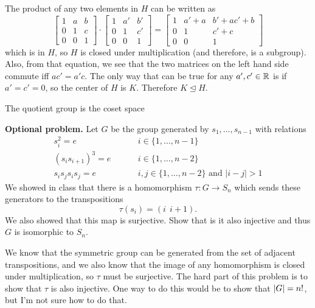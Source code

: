\documentclass{article}
\begin{document}
The product of any two elements in $H$ can be written as
\[ \begin{bmatrix}
    1 & a & b \\
    0 & 1 & c \\
    0 & 0 & 1
\end{bmatrix} \cdot \begin{bmatrix}
    1 & a' & b' \\
    0 & 1 & c' \\
    0 & 0 & 1
\end{bmatrix} = \begin{bmatrix}
    1 & a'+a & b'+ac'+b \\
    0 & 1 & c'+c \\
    0 & 0 & 1
\end{bmatrix} \]
which is in $H$, so $H$ is closed under multiplication (and therefore, is a subgroup). Also, from that equation, we see that the two matrices on the left hand side commute iff $ac'=a'c$. The only way that can be true for any $a',c' \in \mathbb{R}$ is if $a'=c'=0$, so the center of $H$ is $K$. Therefore $K \trianglelefteq H$.
\par
The quotient group is the coset space

\bigskip
\begin{prob}
    \textbf{Optional problem.} Let $G$ be the group generated by $s_1, \dots, s_{n-1}$ with relations
    \begin{align*}
        s_i^2=e &\hspace{1cm} i\in\{1, \dots, n-1\} \\
        (s_is_{i+1})^3=e &\hspace{1cm} i\in\{1, \dots, n-2\} \\
        s_i s_j s_i s_j=e &\hspace{1cm} i,j\in\{1, \dots, n-2\} \text{ and } |i-j|>1
    \end{align*}
    We showed in class that there is a homomorphism $\tau: G \rightarrow S_n$ which sends these generators to the transpositions
    \[ \tau(s_i) = (i\ \ i+1) .\]
    We also showed that this map is surjective. Show that is it also injective and thus $G$ is isomorphic to $S_n$.
\end{prob}

We know that the symmetric group can be generated from the set of adjacent transpositions, and we also know that the image of any homomorphism is closed under multiplication, so $\tau$ must be surjective. The hard part of this problem is to show that $\tau$ is also injective. One way to do this would be to show that $\left\lvert G \right\rvert=n!$, but I'm not sure how to do that.
\end{document}
